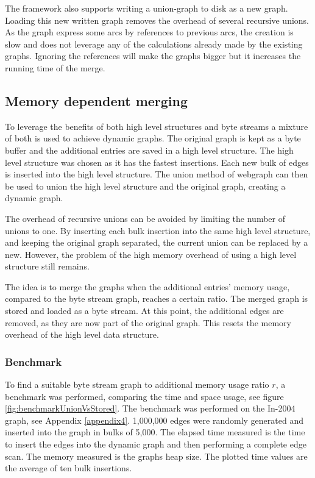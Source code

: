 The framework also supports writing a union-graph to disk as a new graph. Loading this new written graph removes the overhead of several recursive unions. As the graph express some arcs by references to previous arcs, the creation is slow and does not leverage any of the calculations already made by the existing graphs. Ignoring the references will make the graphs bigger but it increases the running time of the merge.

\subsection{Memory dependent merging}
To leverage the benefits of both high level structures and byte streams a mixture of both is used to achieve dynamic graphs. The original graph is kept as a byte buffer and the additional entries are saved in a high level structure. The high level structure was chosen as it has the fastest insertions. Each new bulk of edges is inserted into the high level structure. The union method of webgraph can then be used to union the high level structure and the original graph, creating a dynamic graph.

The overhead of recursive unions can be avoided by limiting the number of unions to one. By inserting each bulk insertion into the same high level structure, and keeping the original graph separated, the current union can be replaced by a new. However, the problem of the high memory overhead of using a high level structure still remains. 

The idea is to merge the graphs when the additional entries' memory usage, compared to the byte stream graph, reaches a certain ratio. The merged graph is stored and loaded as a byte stream. At this point, the additional edges are removed, as they are now part of the original graph. This resets the memory overhead of the high level data structure.


\subsubsection{Benchmark}
To find a suitable byte stream graph to additional memory usage ratio $r$, a benchmark was performed, comparing the time and space usage, see figure \ref{fig:benchmarkUnionVsStored}. The benchmark was performed on the In-2004 graph, see Appendix \ref{appendix4}. 1,000,000 edges were randomly generated and inserted into the graph in bulks of 5,000. The elapsed time measured is the time to insert the edges into the dynamic graph and then performing a complete edge scan. The memory measured is the graphs heap size. The plotted time values are the average of ten bulk insertions.

